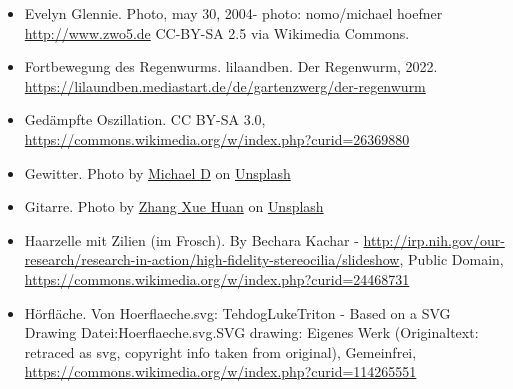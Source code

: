 \documentclass{beamer}
\begin{document}
\begin{frame}
\begin{tiny}
\begin{itemize}
\item
Evelyn Glennie. Photo, may 30, 2004- photo: nomo/michael hoefner \url{http://www.zwo5.de} CC-BY-SA 2.5 via Wikimedia Commons.

\item
Fortbewegung des Regenwurms. lilaandben. Der Regenwurm, 2022. \url{https://lilaundben.mediastart.de/de/gartenzwerg/der-regenwurm}

\item
Gedämpfte Oszillation. CC BY-SA 3.0, \url{https://commons.wikimedia.org/w/index.php?curid=26369880}

\item
Gewitter. Photo by \href{https://unsplash.com/@alienaperture?utm_source=unsplash&utm_medium=referral&utm_content=creditCopyText}{Michael D} on \href{https://unsplash.com/s/photos/thunderstorm?utm_source=unsplash&utm_medium=referral&utm_content=creditCopyText}{Unsplash}

\item
Gitarre. Photo by \href{https://unsplash.com/@wooozxh?utm_source=unsplash&utm_medium=referral&utm_content=creditCopyText}{Zhang Xue Huan} on \href{https://unsplash.com/s/photos/tuning-guitar?utm_source=unsplash&utm_medium=referral&utm_content=creditCopyText}{Unsplash}
  
  
\item
Haarzelle mit Zilien (im Frosch). By Bechara Kachar - \url{http://irp.nih.gov/our-research/research-in-action/high-fidelity-stereocilia/slideshow}, Public Domain, \url{https://commons.wikimedia.org/w/index.php?curid=24468731}

\item
Hörfläche. Von Hoerflaeche.svg: TehdogLukeTriton - Based on a SVG Drawing Datei:Hoerflaeche.svg.SVG drawing: Eigenes Werk (Originaltext: retraced as svg, copyright info taken from original), Gemeinfrei, \url{https://commons.wikimedia.org/w/index.php?curid=114265551}

\end{itemize}
\end{tiny}
\end{frame}
\end{document}
